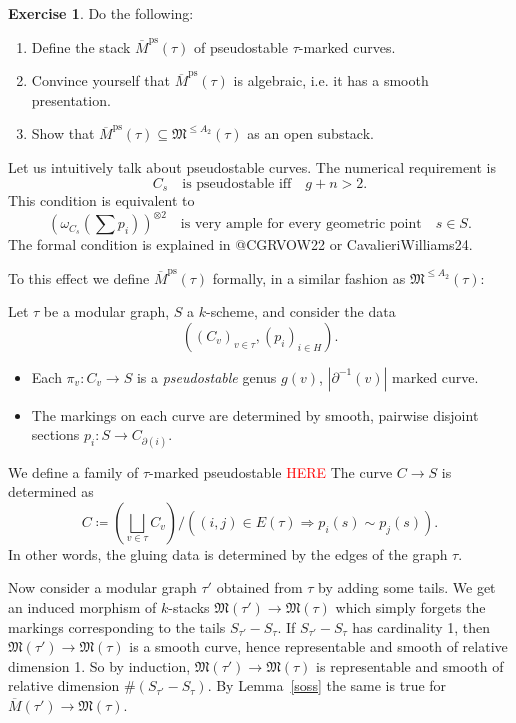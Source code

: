 \documentclass[11pt]{article}
\newcommand{\MM}{\mathfrak{M}}
\newcommand{\del}{\partial}
\newcommand{\ol}{\overline}
\theoremstyle{plain}
\theoremstyle{remark}
\newcommand{\ps}{\mathrm{ps}}
\newcommand{\om}{\omega}
\newcommand{\defeq}{\coloneqq}
\newcommand{\To}{\Rightarrow}
\newcommand{\ox}{\otimes}
\newcommand{\word}[1]{\quad\text{#1}\quad}
\newcommand{\red}[1]{\textcolor{red}{#1}}
\theoremstyle{plain}
\theoremstyle{definition}
\newtheorem{Ej}[Th]{Exercise}
\theoremstyle{remark}
\begin{document}
\begin{ptcb}
  \begin{Ej} Do the following:
    \begin{enumerate}
      \item  Define the stack \(\ol{M}^{\ps}(\tau)\) of pseudostable \(\tau\)-marked curves.
      \item Convince yourself that \(\ol{M}^{\ps}(\tau)\) is algebraic, i.e. it has a smooth presentation. 
      \item Show that \(\ol{M}^{\ps}(\tau)\subseteq\MM^{\leq A_2}(\tau)\) as an open substack.
    \end{enumerate}    
  \end{Ej}
  \tcbline
  Let us intuitively talk about pseudostable curves. The numerical requirement is
  \[
    C_{s}\word{is pseudostable iff} g+n>2.
  \]
  This condition is equivalent to 
  \[
    \left(\om_{C_s}(\sum p_i)\right)^{\ox 2}\word{is very ample for every geometric point}s\in S.
  \]
  The formal condition is explained in @CGRVOW22 or CavalieriWilliams24.\par
  To this effect we define \(\ol{M}^{\ps}(\tau)\) formally, in a similar fashion as \(\MM^{\leq A_2}(\tau)\):

  \begin{Def}
    Let \(\tau\) be  a modular graph, \(S\) a \(k\)-scheme, and consider the data
    \[
      ((C_v)_{v\in\tau},(p_i)_{i\in H}).
    \]
    \begin{itemize}
    \item Each \(\pi_v: C_v\to S\) is a \emph{pseudostable} genus \(g(v)\), \(|\del^{-1}(v)|\) marked curve.
    \item The markings on each curve are determined by smooth, pairwise disjoint sections \(p_i:S\to C_{\del(i)}\).
  \end{itemize}
  We define a family of \(\tau\)-marked pseudostable \red{HERE}
  The curve \(C\to S\) is determined as 
  \[
    C\defeq \left(\bigsqcup_{v\in\tau}C_v\right)/((i,j)\in E(\tau)\To p_i(s)\sim p_j(s)).
  \]
  In other words, the gluing data is determined by the edges of the graph \(\tau\).
  \end{Def}
\end{ptcb}

Now consider a modular graph \(\tau'\) obtained from \(\tau\) by adding
some tails. We get an induced morphism of \(k\)-stacks
\(\MM(\tau')\to\MM(\tau)\) which simply forgets the markings
corresponding to the tails \(S_{\tau'}-S_{\tau}\). If
\(S_{\tau'}-S_{\tau}\) has cardinality 1, then
\(\MM(\tau')\rightarrow\MM(\tau)\) is a smooth
curve, hence representable and smooth of relative dimension 1. So by
induction, \(\MM(\tau')\to\MM(\tau)\) is representable and smooth of
relative dimension \(\#(S_{\tau'}-S_{\tau})\). By Lemma~\ref{soss} the
same is true for \(\ol{M}(\tau')\to\MM(\tau)\).
\end{document}
